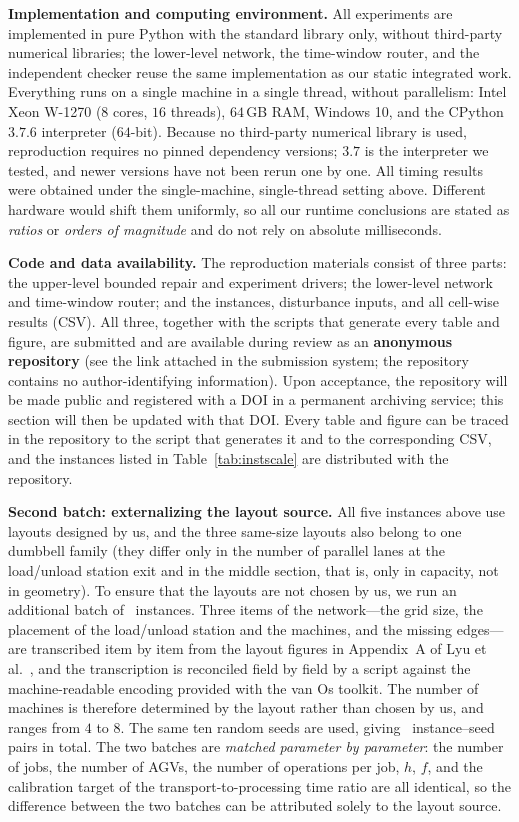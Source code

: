 \textbf{Implementation and computing environment.}
All experiments are implemented in pure Python with the standard library only, without third-party numerical libraries; the lower-level network, the time-window router, and the independent checker
reuse the same implementation as our static integrated work. Everything runs on a single machine in a single thread, without parallelism: Intel Xeon W-1270
(\(8\) cores, \(16\) threads), \(64\)\,GB RAM, Windows 10, and the CPython \(3.7.6\) interpreter (\(64\)-bit).
Because no third-party numerical library is used, reproduction requires no pinned dependency versions; \(3.7\) is the interpreter we tested,
and newer versions have not been rerun one by one. All timing results were obtained under the single-machine, single-thread setting above.
Different hardware would shift them uniformly, so all our runtime conclusions are stated as \emph{ratios} or \emph{orders of magnitude} and do not rely on absolute milliseconds.

\textbf{Code and data availability.}
The reproduction materials consist of three parts: the upper-level bounded repair and experiment drivers; the lower-level network and time-window router;
and the instances, disturbance inputs, and all cell-wise results (CSV). All three, together with the scripts that generate every table and figure, are submitted
and are available during review as an \textbf{anonymous repository} (see the link attached in the submission system; the repository contains no author-identifying information).
Upon acceptance, the repository will be made public and registered with a DOI in a permanent archiving service; this section will then be updated with that DOI.
Every table and figure can be traced in the repository to the script that generates it and to the corresponding CSV,
and the instances listed in Table~\ref{tab:instscale} are distributed with the repository.

\textbf{Second batch: externalizing the layout source.}
All five instances above use layouts designed by us, and the three same-size layouts also belong to one dumbbell family (they differ only in the number of parallel lanes at the load/unload station
exit and in the middle section, that is, only in capacity, not in geometry). To ensure that the layouts are not chosen by us, we run an additional batch of
\NPubInst\ instances. Three items of the network---the grid size, the placement of the load/unload station and the machines, and the missing edges---are transcribed item by item from the layout figures in
Appendix~A of Lyu et al.~\cite{lyu2019approach}, and the transcription is reconciled field by field by a script against the machine-readable encoding
provided with the van Os toolkit. The number of machines is therefore determined by the layout rather than chosen by us, and ranges from \(4\) to \(8\).
The same ten random seeds are used, giving \NPubPairs\ instance--seed pairs in total. The two batches are \emph{matched parameter by parameter}: the number of jobs,
the number of AGVs, the number of operations per job, \(h\), \(f\), and the calibration target of the transport-to-processing time ratio are all identical, so the difference between the two batches
can be attributed solely to the layout source.


